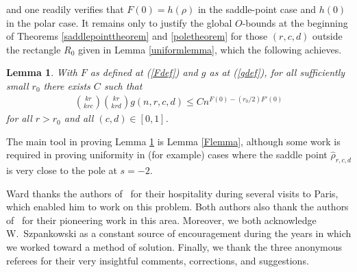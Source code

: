 \documentclass[proceedings]{aofa}
\newtheorem{lemma}{Lemma}
\newcommand{\rhoh}{\hat{\rho}}
\begin{document}
and one readily verifies that $F(0)=h(\rho)$ in the saddle-point case and $h(0)$ in the polar case.
It remains only to justify the global $O$-bounds at the beginning of Theorems \ref{saddlepointtheorem} and \ref{poletheorem} for those $(r,c,d)$ outside the rectangle $R_{0}$ given in Lemma \ref{uniformlemma}, which the following achieves.
\begin{lemma}\label{uniformboundlemma}
With $F$ as defined at (\ref{Fdef}) and $g$ as at (\ref{gdef}), for all sufficiently small $r_{0}$ there exists $C$ such that
\begin{align*}
{kr \choose krc}{kr \choose krd}g(n,r,c,d) \leq C n^{F(0)-(r_{0}/2)F'(0)}
\end{align*}
for all $r>r_{0}$ and all $(c,d) \in [0,1]$.
\end{lemma}
The main tool in proving Lemma \ref{uniformboundlemma} is Lemma \ref{Flemma}, although some work is required in proving uniformity in (for example) cases where the saddle point $\rhoh_{r,c,d}$ is very close to the pole at $s=-2$.


\nocite{*}
\acknowledgements
\label{sec:ack}
Ward thanks the authors of~\cite{Bassino:2012} for their hospitality
during several visits to Paris, which enabled him to work on this
problem.  Both authors also thank the authors of~\cite{Park:2009} for
their pioneering work in this area.  Moreover, we both acknowledge
W.~Szpankowski as a constant source of encouragement during the years
in which we worked toward a method of solution.
Finally, we thank the three anonymous referees for their very
insightful comments, corrections, and suggestions.



\label{sec:biblio}
\end{document}
